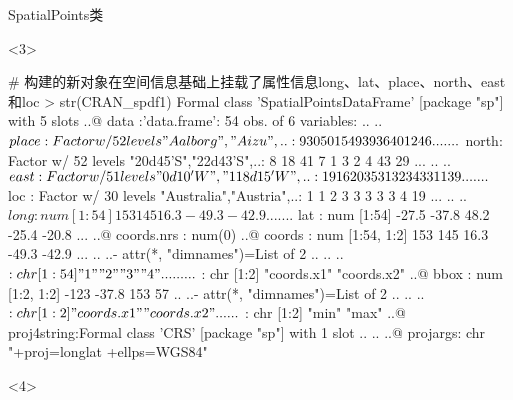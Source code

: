 \begin{frame}[t,fragile]{\subsecname}{SpatialPoints类}
\begin{overlayarea}{\textwidth}{\textheight}
\begin{onlyenv}<3>
\begin{rcode}
# 构建的新对象在空间信息基础上挂载了属性信息long、lat、place、north、east和loc
> str(CRAN_spdf1)
Formal class 'SpatialPointsDataFrame' [package "sp"] with 5 slots
  ..@ data       :'data.frame': 54 obs. of  6 variables:
  .. ..$ place: Factor w/ 52 levels "Aalborg","Aizu",..: 9 30 50 15 49 39 36 40 12 46 ...
  .. ..$ north: Factor w/ 52 levels "20d45'S","22d43'S",..: 8 18 41 7 1 3 2 4 43 29 ...
  .. ..$ east : Factor w/ 51 levels "0d10'W","118d15'W",..: 19 16 20 35 31 32 34 33 11 39 ...
  .. ..$ loc  : Factor w/ 30 levels "Australia","Austria",..: 1 1 2 3 3 3 3 3 4 19 ...
  .. ..$ long : num [1:54] 153 145 16.3 -49.3 -42.9 ...
  .. ..$ lat  : num [1:54] -27.5 -37.8 48.2 -25.4 -20.8 ...
  ..@ coords.nrs : num(0) 
  ..@ coords     : num [1:54, 1:2] 153 145 16.3 -49.3 -42.9 ...
  .. ..- attr(*, "dimnames")=List of 2
  .. .. ..$ : chr [1:54] "1" "2" "3" "4" ...
  .. .. ..$ : chr [1:2] "coords.x1" "coords.x2"
  ..@ bbox       : num [1:2, 1:2] -123 -37.8 153 57
  .. ..- attr(*, "dimnames")=List of 2
  .. .. ..$ : chr [1:2] "coords.x1" "coords.x2"
  .. .. ..$ : chr [1:2] "min" "max"
  ..@ proj4string:Formal class 'CRS' [package "sp"] with 1 slot
  .. .. ..@ projargs: chr "+proj=longlat +ellps=WGS84"  
\end{rcode}
\end{onlyenv}

\begin{onlyenv}<4>
\end{onlyenv}
\end{overlayarea}
\end{frame}

